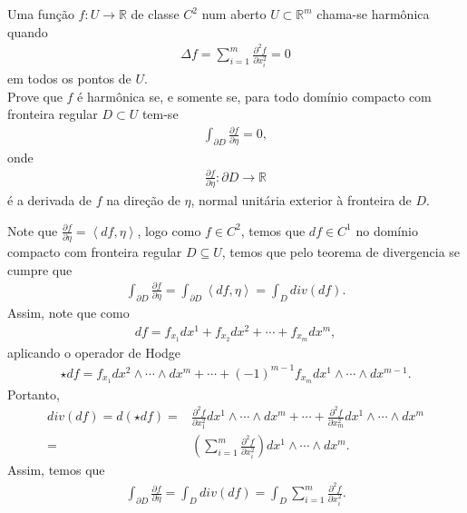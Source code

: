 \begin{homeworkProblem}[Seção 2-12]
  Uma função $f:U\to\mathbb{R}$ de classe $C^{2}$ num aberto $ U\subset\mathbb{R}^{m}$ chama-se harmônica quando
  \begin{align*}
    \Delta f=\sum_{i=1}^{m}\frac{\partial^{2}f}{\partial x_i^{2}}=0   
  \end{align*}
  em todos os pontos de $U$.\\
  Prove que $f$ é harmônica se, e somente se, para todo domínio compacto com fronteira regular $D\subset U$ tem-se
  \begin{align*}
    \int_{\partial D}\frac{\partial f}{\partial\eta}=0,  
  \end{align*}
  onde
  \begin{align*}
    \frac{\partial f}{\partial\eta}:\partial D\to\mathbb{R}
  \end{align*}
  é a derivada de $f$ na direção de $\eta$, normal unitária exterior à fronteira de $D$.
  \begin{solution}
    Note que $\frac{\partial f}{\partial \eta}=\left\langle df,\eta \right\rangle$, logo como $f\in C^{2}$, temos que $df\in C^{1}$ no domínio compacto com fronteira regular $D\subseteq U$, temos que pelo teorema de divergencia se cumpre que
    \begin{align*}
      \int_{\partial D}\frac{\partial f}{\partial \eta}=\int_{\partial D}\left\langle df, \eta\right\rangle=\int_{D} div(df).
    \end{align*}
    Assim, note que como
    \begin{align*}
      df=f_{x_1}dx^{1}+f_{x_2}dx^{2}+\cdots+f_{x_m}dx^{m},
    \end{align*}
    aplicando o operador de Hodge
    \begin{align*}
      \star df=f_{x_1}dx^{2}\wedge\cdots\wedge dx^{m}+\cdots+(-1)^{m-1}f_{x_m}dx^{1}\wedge\cdots\wedge dx^{m-1}.
    \end{align*}
    Portanto,
    \begin{align*}
      div(df)=d(\star df)=&\frac{\partial^2 f}{\partial x_1^{2}}dx^{1}\wedge\cdots\wedge dx^{m}+\cdots+\frac{\partial^{2}f }{\partial x_m^{2}}dx^{1}\wedge\cdots\wedge dx^{m}\\
      =&\left( \sum_{i=1}^{m}\frac{\partial^{2}f }{\partial x_i^{2}} \right)dx^{1}\wedge\cdots\wedge dx^{m}.
    \end{align*}
    Assim, temos que
    \begin{align*}
      \int_{\partial D}\frac{\partial f}{\partial \eta}=\int_{D}div(df)=\int_{D}\sum_{i=1}^{m}\frac{\partial^{2}f }{\partial x_i^{2}}.

\end{align*}
\end{solution}
\end{homeworkProblem}
